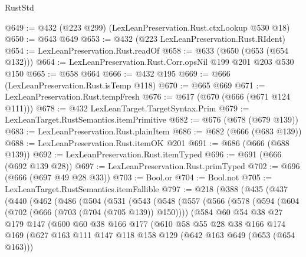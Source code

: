 \begin{lexlean}{RustStd}
\begin{coremodule}
{\begin{coremodule}
{{{{{@649 := @432 (@223 @299) (LexLeanPreservation.Rust.ctxLookup @530 @18)
@650 := @643 @649
@653 := @432 (@223 LexLeanPreservation.Rust.RIdent)
@654 := LexLeanPreservation.Rust.readOf
@658 := @633 (@650 (@653 (@654 @132)))
@664 := LexLeanPreservation.Rust.Corr.opsNil @199 @201 @203 @530 @150
@665 := @658 @664
@666 := @432 @195
@669 := @666 (LexLeanPreservation.Rust.isTemp @118)
@670 := @665 @669
@671 := LexLeanPreservation.Rust.tempFresh
@676 := @617 (@670 (@666 (@671 @124 @111)))
@678 := @432 LexLeanTarget.TargetSyntax.Prim
@679 := LexLeanTarget.RustSemantics.itemPrimitive
@682 := @676 (@678 (@679 @139))
@683 := LexLeanPreservation.Rust.plainItem
@686 := @682 (@666 (@683 @139))
@688 := LexLeanPreservation.Rust.itemOK @201
@691 := @686 (@666 (@688 @139))
@692 := LexLeanPreservation.Rust.itemTyped
@696 := @691 (@666 (@692 @139 @28))
@697 := LexLeanPreservation.Rust.primTyped
@702 := @696 (@666 (@697 @49 @28 @33))
@703 := Bool.or
@704 := Bool.not
@705 := LexLeanTarget.RustSemantics.itemFallible
@797 := @218
    (@388
      (@435
        (@437
          (@440
            (@462
              (@486
                (@504
                  (@531
                    (@543
                      (@548
                        (@557
                          (@566
                            (@578
                              (@594
                                (@604 (@702 (@666 (@703 (@704 (@705 @139)) @150))))
                                (@584
                                  @60
                                  @54
                                  @38
                                  @27
                                  @179
                                  @147
                                  (@600
                                    @60
                                    @38
                                    @166
                                    @177
                                    (@610
                                      @58
                                      @55
                                      @28
                                      @38
                                      @166
                                      @174
                                      @169
                                      (@627
                                        @163
                                        @111
                                        @147
                                        @118
                                        @158
                                        @129
                                        (@642 @163 @649 (@653 (@654 @163)))
}}}}}
\end{coremodule}}
\end{coremodule}
\end{lexlean}
